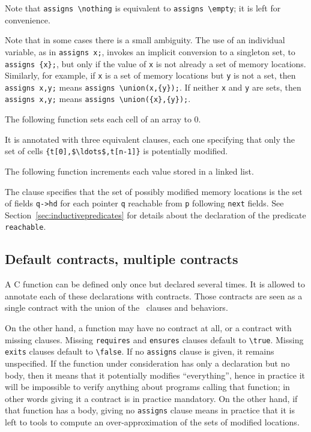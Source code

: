 Note that \lstinline|assigns \nothing| is equivalent to
\lstinline|assigns \empty|; it is left for convenience.

Note that in some cases there is a small ambiguity. The
use of an
individual variable, as in \lstinline|assigns x;|, invokes an implicit conversion to a singleton set, to
\lstinline|assigns {x};|, but only if the value of \lstinline|x| is not already a set of memory locations.
Similarly, for example, if \lstinline|x| is a set of memory locations but \lstinline|y| is not a set, then \lstinline|assigns x,y;| means
\lstinline|assigns \union(x,{y});|. If neither \lstinline|x| and \lstinline|y| are sets, then \lstinline|assigns x,y;| means
\lstinline|assigns \union({x},{y});|.

\begin{example}
  The following function sets each cell of an array to 0.

%
  It is annotated with three equivalent \assigns{} clauses, each one
  specifying that only the set of cells
  \lstinline|{t[0],$\ldots$,t[n-1]}|
  is potentially modified.
\end{example}

\begin{example}
  \label{ex:locations-list}
  The following function increments each value stored in a linked
  list.

%
  The \assigns{} clause specifies that the set of possibly modified memory
  locations is the set of fields \lstinline|q->hd| for each pointer
  \lstinline|q|
  reachable from \lstinline|p| following \lstinline|next| fields. See
  Section~\ref{sec:inductivepredicates} for details about the
  declaration of the predicate \texttt{reachable}.
\end{example}

\subsection{Default contracts, multiple contracts}
\label{sec:multiplecontracts}

A C function can be defined only once but declared several times.
It is allowed to annotate each of these declarations with contracts.
Those contracts are seen as a single contract with the union of the
\requires\ clauses and behaviors.

On the other hand, a function may have no contract at all, or a
contract with missing clauses. Missing \lstinline|requires| and
\lstinline|ensures| clauses default to \lstinline|\true|. Missing
\lstinline|exits| clauses default to \lstinline|\false|.
If no \lstinline|assigns| clause is given, it remains unspecified. If the
function under consideration has only a declaration but no body, then
it means that it potentially modifies ``everything'', hence in practice
it will be impossible to verify anything about programs calling that
function; in other words giving it a contract is in practice
mandatory. On the other hand, if that function has a body, giving no
\lstinline|assigns| clause means in practice that it is left to tools to
compute an over-approximation of the sets of modified locations.

